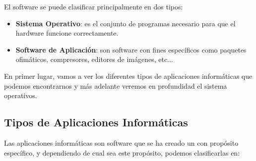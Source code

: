 El software se puede clasificar principalmente en dos tipos:

\begin{itemize}
    \item \textbf{Sistema Operativo}: es el conjunto de programas necesario para que el hardware funcione correctamente.
    \item \textbf{Software de Aplicación}: son software con fines específicos como paquetes ofimáticos, compresores, editores de imágenes, etc...
\end{itemize}

En primer lugar, vamos a ver los diferentes tipos de aplicaciones informáticas que podemos encontrarnos y más adelante veremos en profundidad el sistema operativos.

\subsection{Tipos de Aplicaciones Informáticas}
Las aplicaciones informáticas son software que se ha creado un con propósito específico, y dependiendo de cual sea este propósito, podemos clasificarlas en:

